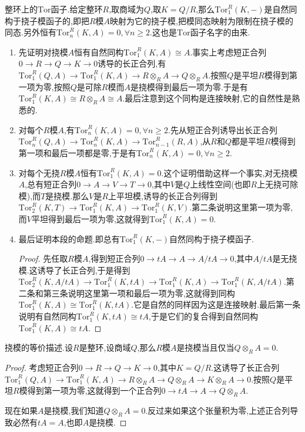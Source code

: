 整环上的$\mathrm{Tor}$函子.给定整环$R$,取商域为$Q$,取$K=Q/R$,那么$\mathrm{Tor}_1^R(K,-)$是自然同构于挠子模函子的,即把$R$模$A$映射为它的挠子模,把模同态映射为限制在挠子模的同态.另外恒有$\mathrm{Tor}_n^R(K,A)=0,\forall n\ge2$.这也是$\mathrm{Tor}$函子名字的由来.
\begin{enumerate}
	\item 先证明对挠模$A$恒有自然同构$\mathrm{Tor}_1^R(K,A)\cong A$.事实上考虑短正合列$0\to R\to Q\to K\to0$诱导的长正合列,有$\mathrm{Tor}_1^R(Q,A)\to\mathrm{Tor}_1^R(K,A)\to R\otimes_RA\to Q\otimes_RA$.按照$Q$是平坦$R$模得到第一项为零,按照$Q$是可除$R$模而$A$是挠模得到最后一项为零.于是有$\mathrm{Tor}_1^R(K,A)\cong R\otimes_RA\cong A$.最后注意到这个同构是连接映射,它的自然性是熟悉的.
	\item 对每个$R$模$A$,有$\mathrm{Tor}_n^R(K,A)=0,\forall n\ge2$.先从短正合列诱导出长正合列$\mathrm{Tor}_n^R(Q,A)\to\mathrm{Tor}_n^R(K,A)\to\mathrm{Tor}_{n-1}^R(R,A)$,从$R$和$Q$都是平坦$R$模得到第一项和最后一项都是零,于是有$\mathrm{Tor}_n^R(K,A)=0,\forall n\ge2$.
	\item 对每个无挠$R$模$A$恒有$\mathrm{Tor}_1^R(K,A)=0$.这个证明借助这样一个事实,对无挠模$A$,总有短正合列$0\to A\to V\to T\to0$,其中$V$是$Q$上线性空间(也即$R$上无挠可除模),而$T$是挠模.那么$V$是$R$上平坦模,诱导的长正合列得到$\mathrm{Tor}_2^R(K,T)\to\mathrm{Tor}_1^R(K,A)\to\mathrm{Tor}_1^R(K,V)$.第二条说明这里第一项为零,而$V$平坦得到最后一项为零,这就得到$\mathrm{Tor}_1^R(K,A)=0$.
	\item 最后证明本段的命题.即总有$\mathrm{Tor}_1^R(K,-)$自然同构于挠子模函子.
	\begin{proof}
	
	先任取$R$模$A$,得到短正合列$0\to tA\to A\to A/tA\to0$,其中$A/tA$是无挠模.这诱导了长正合列,于是得到$\mathrm{Tor}_2^R(K,A/tA)\to\mathrm{Tor}_1^R(K,tA)\to\mathrm{Tor}_1^R(K,A)\to\mathrm{Tor}_1^R(K,A/tA)$.第二条和第三条说明这里第一项和最后一项为零,这就得到同构$\mathrm{Tor}_1^R(K,A)\cong\mathrm{Tor}_1^R(K,tA)$.它是自然的同样因为这是连接映射.最后第一条说明有自然同构$\mathrm{Tor}_1^R(K,tA)\cong tA$,于是它们的复合得到自然同构$\mathrm{Tor}_1^R(K,A)\cong tA$.
	\end{proof}
\end{enumerate}

挠模的等价描述.设$R$是整环,设商域$Q$,那么$R$模$A$是挠模当且仅当$Q\otimes_RA=0$.
\begin{proof}
	
	考虑短正合列$0\to R\to Q\to K\to0$,其中$K=Q/R$.这诱导了长正合列$\mathrm{Tor}_1^R(Q,A)\to\mathrm{Tor}_1^R(K,A)\to R\otimes_RA\to Q\otimes_RA\to K\otimes_RA\to0$.按照$Q$是平坦$R$模得到第一项为零,这就得到一个正合列$0\to tA\to A\to Q\otimes_RA$.
	
	现在如果$A$是挠模,我们知道$Q\otimes_RA=0$.反过来如果这个张量积为零,上述正合列导致必然有$tA=A$,也即$A$是挠模.
\end{proof}

